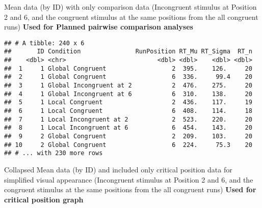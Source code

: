 \documentclass[
]{article}
\newenvironment{Shaded}{\begin{snugshade}}{\end{snugshade}}
\newcommand{\CommentTok}[1]{\textcolor[rgb]{0.56,0.35,0.01}{\textit{#1}}}
\newcommand{\KeywordTok}[1]{\textcolor[rgb]{0.13,0.29,0.53}{\textbf{#1}}}
\newcommand{\NormalTok}[1]{#1}
\newcommand{\OperatorTok}[1]{\textcolor[rgb]{0.81,0.36,0.00}{\textbf{#1}}}
\newcommand{\StringTok}[1]{\textcolor[rgb]{0.31,0.60,0.02}{#1}}
\begin{document}
Mean data (by ID) with only comparison data (Incongruent stimulus at
Position 2 and 6, and the congruent stimulus at the same positions from
the all congruent runs) \textbf{Used for Planned pairwise comparison
analyses}

\begin{Shaded}
\end{Shaded}

\begin{verbatim}
## # A tibble: 240 x 6
##       ID Condition               RunPosition RT_Mu RT_Sigma  RT_n
##    <dbl> <chr>                         <dbl> <dbl>    <dbl> <dbl>
##  1     1 Global Congruent                  2  395.    126.     20
##  2     1 Global Congruent                  6  336.     99.4    20
##  3     1 Global Incongruent at 2           2  476.    275.     20
##  4     1 Global Incongruent at 6           6  310.    138.     20
##  5     1 Local Congruent                   2  436.    117.     19
##  6     1 Local Congruent                   6  408.    114.     18
##  7     1 Local Incongruent at 2            2  523.    220.     20
##  8     1 Local Incongruent at 6            6  454.    143.     20
##  9     2 Global Congruent                  2  209.    103.     20
## 10     2 Global Congruent                  6  224.     75.3    20
## # ... with 230 more rows
\end{verbatim}

Collapsed Mean data (by ID) and included only critical position data for
simplified visual appearance (Incongruent stimulus at Position 2 and 6,
and the congruent stimulus at the same positions from the all congruent
runs) \textbf{Used for critical position graph}
\end{document}
